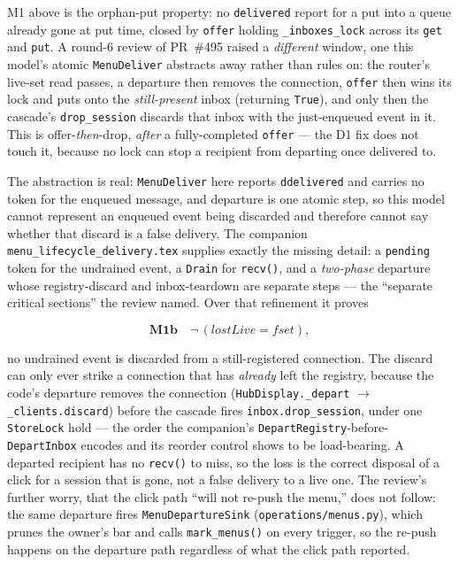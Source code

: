 \documentclass[a4paper,10pt,fleqn]{article}
\begin{document}
M1 above is the orphan-put property: no \texttt{delivered} report for a put
into a queue already gone at put time, closed by \texttt{offer} holding
\texttt{\_inboxes\_lock} across its \texttt{get} and \texttt{put}. A round-6
review of PR~\#495 raised a \emph{different} window, one this model's atomic
\texttt{MenuDeliver} abstracts away rather than rules on: the router's
live-set read passes, a departure then removes the connection, \texttt{offer}
then wins its lock and puts onto the \emph{still-present} inbox (returning
\texttt{True}), and only then the cascade's \texttt{drop\_session} discards
that inbox with the just-enqueued event in it. This is offer-\emph{then}-drop,
\emph{after} a fully-completed \texttt{offer} --- the D1 fix does not touch it,
because no lock can stop a recipient from departing once delivered to.

The abstraction is real: \texttt{MenuDeliver} here reports \texttt{ddelivered}
and carries no token for the enqueued message, and departure is one atomic
step, so this model cannot represent an enqueued event being discarded and
therefore cannot say whether that discard is a false delivery. The companion
\texttt{menu\_lifecycle\_delivery.tex} supplies exactly the missing detail: a
\texttt{pending} token for the undrained event, a \texttt{Drain} for
\texttt{recv()}, and a \emph{two-phase} departure whose registry-discard and
inbox-teardown are separate steps --- the ``separate critical sections'' the
review named. Over that refinement it proves

\[ \textbf{M1b} \quad \lnot\, (lostLive = fset), \]

no undrained event is discarded from a still-registered connection. The
discard can only ever strike a connection that has \emph{already} left the
registry, because the code's departure removes the connection
(\texttt{HubDisplay.\_depart} $\to$ \texttt{\_clients.discard}) before the
cascade fires \texttt{inbox.drop\_session}, under one \texttt{StoreLock} hold
--- the order the companion's \texttt{DepartRegistry}-before-\texttt{DepartInbox}
encodes and its reorder control shows to be load-bearing. A departed recipient
has no \texttt{recv()} to miss, so the loss is the correct disposal of a click
for a session that is gone, not a false delivery to a live one. The review's
further worry, that the click path ``will not re-push the menu,'' does not
follow: the same departure fires \texttt{MenuDepartureSink}
(\texttt{operations/menus.py}), which prunes the owner's bar and calls
\texttt{mark\_menus()} on every trigger, so the re-push happens on the
departure path regardless of what the click path reported.
\end{document}
